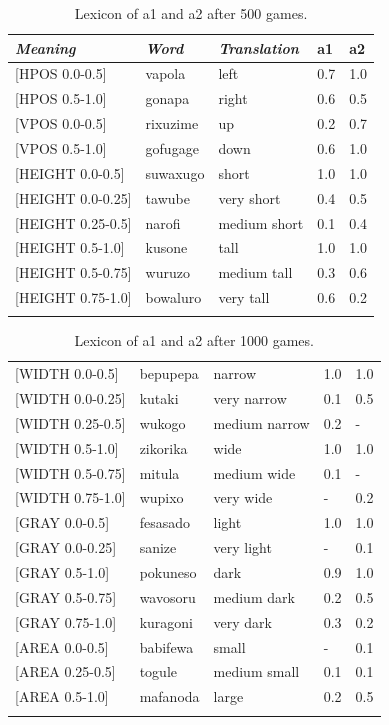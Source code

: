 \begin{table}
\begin{center}
\begin{tabular}{ l  l  l  l  l }
\lsptoprule
{\itshape Meaning}&{\itshape Word}&{\itshape Translation} & {\bfshape  a1}&{\bfshape  a2} \\ \midrule
{}[HPOS 0.0-0.5]&vapola&left &0.7&1.0\\ 
{}[HPOS 0.5-1.0]&gonapa&right &0.6&0.5\\ 
{}[VPOS 0.0-0.5]&rixuzime& up & 0.2&0.7\\ 
{}[VPOS 0.5-1.0]&gofugage& down &0.6&1.0\\ 
{}[HEIGHT 0.0-0.5]&suwaxugo&short & 1.0&1.0\\ 
{}[HEIGHT 0.0-0.25]&tawube&very short & 0.4&0.5\\ 
{}[HEIGHT 0.25-0.5]&narofi&medium short&0.1&0.4\\ 
{}[HEIGHT 0.5-1.0]&kusone&tall&1.0&1.0\\ 
{}[HEIGHT 0.5-0.75]&wuruzo&medium tall&0.3&0.6\\ 
{}[HEIGHT 0.75-1.0]&bowaluro&very tall&0.6&0.2\\ 
\lspbottomrule
\end{tabular}
\caption{\label{tab:lex500a} Lexicon of {\bfshape  a1} and {\bfshape  a2} after 500 games.}
\end{center}
\end{table}



\begin{table}
\begin{center}
\begin{tabular}{ l  l  l  l  l }
\lsptoprule
{}[WIDTH 0.0-0.5]&bepupepa&narrow & 1.0&1.0\\ 
{}[WIDTH 0.0-0.25]&kutaki&very narrow & 0.1&0.5\\ 
{}[WIDTH 0.25-0.5]&wukogo&medium narrow & 0.2&-\\ 
{}[WIDTH 0.5-1.0]&zikorika&wide & 1.0&1.0\\ 
{}[WIDTH 0.5-0.75]&mitula&medium wide &0.1&-\\ 
{}[WIDTH 0.75-1.0]&wupixo&very wide & -&0.2\\ 
{}[GRAY 0.0-0.5]&fesasado&light & 1.0&1.0\\ 
{}[GRAY 0.0-0.25]&sanize&very light & -&0.1\\ 
{}[GRAY 0.5-1.0]&pokuneso&dark &0.9&1.0\\ 
{}[GRAY 0.5-0.75]&wavosoru&medium dark & 0.2&0.5\\ 
{}[GRAY 0.75-1.0]&kuragoni&very dark &0.3&0.2\\ 
{}[AREA 0.0-0.5]&babifewa&small & -&0.1\\ 
{}[AREA 0.25-0.5]&togule&medium small & 0.1&0.1\\ 
{}[AREA 0.5-1.0]&mafanoda&large & 0.2&0.5\\ 
\lspbottomrule
\end{tabular}
\caption{\label{tab:lex500b} Lexicon of {\bfshape  a1} and {\bfshape  a2} after 1000 games.}
\end{center}
\end{table}

